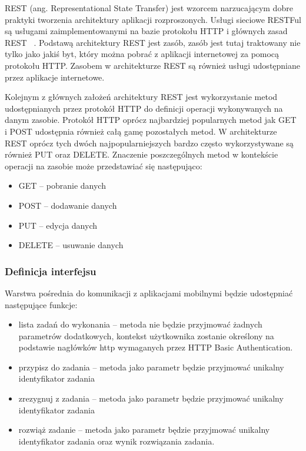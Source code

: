 REST (ang. Representational State Transfer) jest wzorcem narzucającym dobre praktyki tworzenia architektury aplikacji rozproszonych. Usługi sieciowe RESTFul  są usługami zaimplementowanymi na bazie protokołu HTTP i głównych zasad REST ~\cite{rest}.
Podstawą architektury REST jest zasób, zasób jest tutaj traktowany nie tylko jako jakiś byt, który można pobrać z aplikacji internetowej za pomocą protokołu HTTP. Zasobem w architekturze REST są również usługi udostępniane przez aplikacje internetowe.  

Kolejnym z głównych założeń architektury REST jest wykorzystanie metod udostępnianych przez protokół HTTP do definicji operacji wykonywanych na danym zasobie. Protokół HTTP oprócz najbardziej popularnych metod jak GET i POST udostępnia również całą gamę pozostałych metod. W architekturze REST oprócz tych dwóch najpopularniejszych bardzo często wykorzystywane są również PUT oraz DELETE. Znaczenie poszczególnych metod w kontekście operacji na zasobie może przedstawiać się następująco:
\begin{itemize}
\item GET -- pobranie danych
\item POST -- dodawanie danych
\item PUT -- edycja danych
\item DELETE -- usuwanie danych 
\end{itemize}


\subsubsection{Definicja interfejsu}

Warstwa pośrednia do komunikacji z aplikacjami mobilnymi będzie udostępniać następujące funkcje:

\begin{itemize}
\item lista zadań do wykonania -- metoda nie będzie przyjmować żadnych parametrów dodatkowych, kontekst użytkownika zostanie określony na podstawie nagłówków http wymaganych przez HTTP Basic Authentication. 
\item przypisz do zadania -- metoda jako parametr będzie przyjmować unikalny identyfikator zadania  
\item zrezygnuj z zadania -- metoda jako parametr będzie przyjmować unikalny identyfikator zadania  
\item rozwiąż zadanie -- metoda jako parametr będzie przyjmować unikalny identyfikator zadania  oraz wynik rozwiązania zadania. 
\end{itemize}


